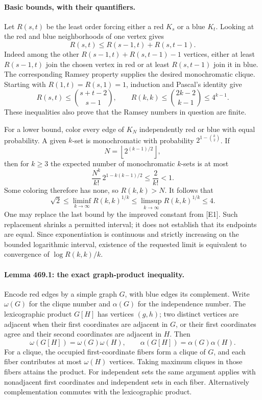 \documentclass[11pt]{article}
\begin{document}
\paragraph{Basic bounds, with their quantifiers.}
Let $R(s,t)$ be the least order forcing either a red $K_s$ or a blue $K_t$. Looking at the red and blue neighborhoods of one vertex gives
\begin{equation}\label{a469:recurrence}
                    R(s,t)\leq R(s-1,t)+R(s,t-1).
\end{equation}
Indeed among the other $R(s-1,t)+R(s,t-1)-1$ vertices, either at least $R(s-1,t)$ join the chosen vertex in red or at least $R(s,t-1)$ join it in blue. The corresponding Ramsey property supplies the desired monochromatic clique. Starting with $R(1,t)=R(s,1)=1$, induction and Pascal's identity give
\[
                R(s,t)\leq\binom{s+t-2}{s-1},\qquad
                R(k,k)\leq\binom{2k-2}{k-1}\leq4^{k-1}.
\]
These inequalities also prove that the Ramsey numbers in question are finite.

For a lower bound, color every edge of $K_N$ independently red or blue with equal probability. A given $k$-set is monochromatic with probability $2^{1-\binom{k}{2}}$. If
\[
                         N=\left\lfloor2^{(k-1)/2}\right\rfloor,
\]
then for $k\geq3$ the expected number of monochromatic $k$-sets is at most
\[
       \frac{N^k}{k!}\,2^{1-k(k-1)/2}\leq\frac2{k!}<1.
\]
Some coloring therefore has none, so $R(k,k)>N$. It follows that
\begin{equation}\label{a469:bounds}
 \sqrt2\leq\liminf_{k\to\infty}R(k,k)^{1/k}
 \leq\limsup_{k\to\infty}R(k,k)^{1/k}\leq4.
\end{equation}
One may replace the last bound by the improved constant from [E1]. Such replacement shrinks a permitted interval; it does not establish that its endpoints are equal. Since exponentiation is continuous and strictly increasing on the bounded logarithmic interval, existence of the requested limit is equivalent to convergence of $\log R(k,k)/k$.

\paragraph{Lemma 469.1: the exact graph-product inequality.}
Encode red edges by a simple graph $G$, with blue edges its complement. Write $\omega(G)$ for the clique number and $\alpha(G)$ for the independence number. The lexicographic product $G[H]$ has vertices $(g,h)$; two distinct vertices are adjacent when their first coordinates are adjacent in $G$, or their first coordinates agree and their second coordinates are adjacent in $H$. Then
\begin{equation}\label{a469:productnumbers}
      \omega(G[H])=\omega(G)\omega(H),\qquad
      \alpha(G[H])=\alpha(G)\alpha(H).
\end{equation}
For a clique, the occupied first-coordinate fibers form a clique of $G$, and each fiber contributes at most $\omega(H)$ vertices. Taking maximum cliques in those fibers attains the product. For independent sets the same argument applies with nonadjacent first coordinates and independent sets in each fiber. Alternatively complementation commutes with the lexicographic product.
\end{document}

